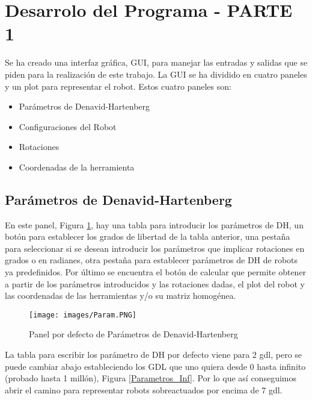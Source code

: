 \documentclass[a4paper, fontsize=11pt]{scrartcl} %
\numberwithin{equation}{section} %
\numberwithin{figure}{section} %
\numberwithin{table}{section} %
\begin{document}
	
	\section{Desarrolo del Programa - PARTE 1}
	
	Se ha creado una interfaz gráfica, GUI, para manejar las entradas y salidas que se piden para la realización de este trabajo. La GUI se ha dividido en cuatro paneles y un plot para representar el robot. Estos cuatro paneles son:
	
	\begin{itemize}
		\item Parámetros de Denavid-Hartenberg
		\item Configuraciones del Robot
		\item Rotaciones
		\item Coordenadas de la herramienta
	\end{itemize}
	
	\subsection{Parámetros de Denavid-Hartenberg} \label{Denavid-Hartenberg}
	
	En este panel, Figura \ref{Parametros}, hay una tabla para introducir los parámetros de DH, un botón para establecer los grados de libertad de la tabla anterior, una pestaña para seleccionar si se desean introducir los parámetros que implicar rotaciones en grados o en radianes, otra pestaña para establecer parámetros de DH de robots ya predefinidos. Por último se encuentra el botón de calcular que permite obtener a partir de los parámetros introducidos y las rotaciones dadas, el plot del robot y las coordenadas de las herramientas y/o su matriz homogénea.\\
	
	\begin{figure}[h!]
		\centering
		\texttt{[image: images/Param.PNG]}
		\caption{Panel por defecto de Parámetros de Denavid-Hartenberg}
		\label{Parametros}
	\end{figure}
	\FloatBarrier
	
	La tabla para escribir los parámetro de DH por defecto viene para 2 gdl, pero se puede cambiar abajo estableciendo los GDL que uno quiera desde 0 hasta infinito (probado hasta 1 millón), Figura \ref{Parametros_Inf}. Por lo que así conseguimos abrir el camino para representar robots sobreactuados por encima de 7 gdl.\\
	
\end{document}
